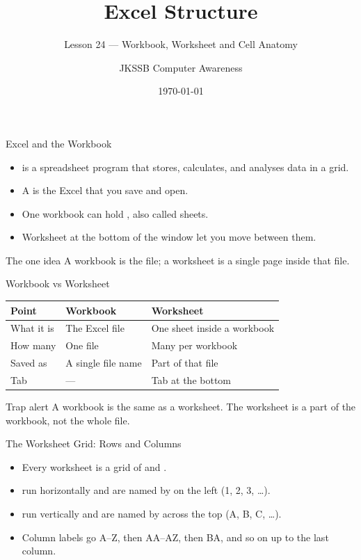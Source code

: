 \documentclass[aspectratio=169]{beamer}
\title{Excel Structure}
\subtitle{Lesson 24 --- Workbook, Worksheet and Cell Anatomy}
\author{JKSSB Computer Awareness}
\date{\today}
\begin{document}
\frame{\titlepage}

\begin{frame}{Excel and the Workbook}
  \begin{itemize}
    \item {} is a spreadsheet program that stores,
      calculates, and analyses data in a grid.
    \item A  is the Excel  that you save and open.
    \item One workbook can hold , also called sheets.
    \item Worksheet  at the bottom of the window let you move
      between them.
  \end{itemize}
  \begin{block}{The one idea}
    A workbook is the file; a worksheet is a single page inside that file.
  \end{block}
\end{frame}

\begin{frame}{Workbook vs Worksheet}
  \begin{center}
    \begin{tabular}{lll}
      \toprule
      \textbf{Point} & \textbf{Workbook} & \textbf{Worksheet} \\
      \midrule
      What it is & The Excel file & One sheet inside a workbook \\
      How many & One file & Many per workbook \\
      Saved as & A single file name & Part of that file \\
      Tab & --- & Tab at the bottom \\
      \bottomrule
    \end{tabular}
  \end{center}
  \vspace{0.25cm}
  \begin{alertblock}{Trap alert}
    A workbook is  the same as a worksheet. The worksheet is a part
    of the workbook, not the whole file.
  \end{alertblock}
\end{frame}

\begin{frame}{The Worksheet Grid: Rows and Columns}
  \begin{itemize}
    \item Every worksheet is a grid of  and .
    \item {} run horizontally and are named by  on the
      left (1, 2, 3, \dots).
    \item {} run vertically and are named by  across
      the top (A, B, C, \dots).
    \item Column labels go A--Z, then AA--AZ, then BA, and so on up to the
      last column.
  \end{itemize}
\end{frame}
\end{document}
